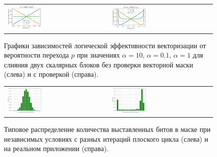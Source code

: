 \documentclass[a4paper,14pt]{extarticle}                     %
\theoremstyle{plain}                                         %
\begin{document}
\begin{figure}[!ht]
\centering
\begin{tabular}{ll}
	\includegraphics[width=0.35\textwidth]{./pics/text_4_vec_mrg_under_cond/chart_e_merged.png}
	&
	\includegraphics[width=0.35\textwidth]{./pics/text_4_vec_check_mask/chart_e_merged.png}
\end{tabular}
\singlespacing
\caption{Графики зависимостей логической эффективности векторизации от вероятности перехода $p$ при значениях $\alpha = 10$, $\alpha = 0.1$, $\alpha = 1$ для слияния двух скалярных блоков без проверки векторной маски (слева) и с проверкой (справа).}
\label{fig:text_4_vec_under_cond_chart_e_merged}
\end{figure}

\begin{figure}[!ht]
\centering
\begin{tabular}{ll}
\includegraphics[width=0.35\textwidth]{./pics/text_4_vec_comb_mask/independent_p.png}
&
\includegraphics[width=0.35\textwidth]{./pics/text_4_vec_comb_mask/real_p.png}
\end{tabular}
\singlespacing
\caption{Типовое распределение количества выставленных битов в маске при независимых условиях с разных итераций плоского цикла (слева) и на реальном приложении (справа).}
\label{fig:text_4_vec_comb_mask_independent_p}
\end{figure}
\end{document}
